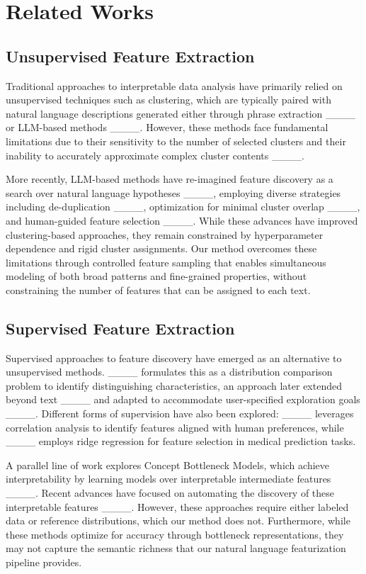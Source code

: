 \section{Related Works}
\subsection{Unsupervised Feature Extraction}

Traditional approaches to interpretable data analysis have primarily relied on unsupervised techniques such as clustering, which are typically paired with natural language descriptions generated either through phrase extraction ____ or LLM-based methods ____. However, these methods face fundamental limitations due to their sensitivity to the number of selected clusters and their inability to accurately approximate complex cluster contents ____.

More recently, LLM-based methods have re-imagined feature discovery as a search over natural language hypotheses ____, employing diverse strategies including de-duplication ____, optimization for minimal cluster overlap ____, and human-guided feature selection ____. While these advances have improved clustering-based approaches, they remain constrained by hyperparameter dependence and rigid cluster assignments. Our method overcomes these limitations through controlled feature sampling that enables simultaneous modeling of both broad patterns and fine-grained properties, without constraining the number of features that can be assigned to each text.

\subsection{Supervised Feature Extraction}

Supervised approaches to feature discovery have emerged as an alternative to unsupervised methods. ____ formulates this as a distribution comparison problem to identify distinguishing characteristics, an approach later extended beyond text ____ and adapted to accommodate user-specified exploration goals ____. Different forms of supervision have also been explored: ____ leverages correlation analysis to identify features aligned with human preferences, while ____ employs ridge regression for feature selection in medical prediction tasks.

A parallel line of work explores Concept Bottleneck Models, which achieve interpretability by learning models over interpretable intermediate features ____. Recent advances have focused on automating the discovery of these interpretable features ____. However, these approaches require either labeled data or reference distributions, which our method does not. Furthermore, while these methods optimize for accuracy through bottleneck representations, they may not capture the semantic richness that our natural language featurization pipeline provides.

